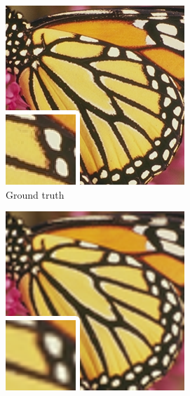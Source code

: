 \documentclass[
			fontsize = 12pt,
			paper = a4
			]
			{scrartcl}%
\newcommand{\?}{\ensuremath{^\texttt{\textbf [CITATION~NEEDED]}}}
\begin{document}
\begin{figure}[!hbt]
     \centering
     \begin{subfigure}[b]{0.3\textwidth}
         \centering
         \includegraphics[width=\textwidth]{fig/examples/butterfly_GT}
         \caption{Ground truth}
     \end{subfigure}
     \hfill
     \begin{subfigure}[b]{0.3\textwidth}
         \centering
         \includegraphics[width=\textwidth]{fig/examples/butterfly_bicubic_x3}

\end{subfigure}
\end{figure}
\end{document}
